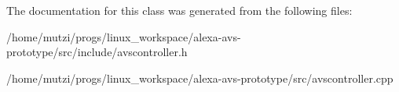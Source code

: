The documentation for this class was generated from the following files\+:\begin{DoxyCompactItemize}
\item 
/home/mutzi/progs/linux\+\_\+workspace/alexa-\/avs-\/prototype/src/include/avscontroller.\+h\item 
/home/mutzi/progs/linux\+\_\+workspace/alexa-\/avs-\/prototype/src/avscontroller.\+cpp\end{DoxyCompactItemize}
